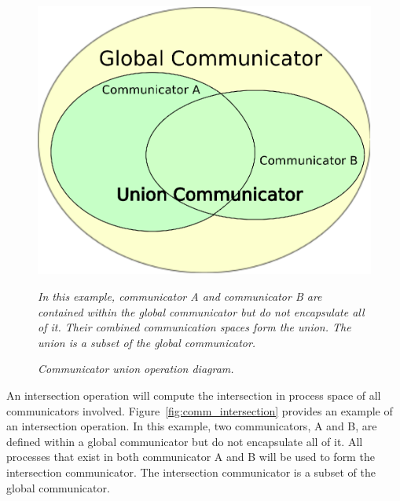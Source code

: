 \documentclass[letterpaper,12pt]{article}
\begin{document}
\begin{figure}[htpb!]
  \centering
  \includegraphics[width=5in]{union_comm.eps}
  \caption{\sl Communicator union operation diagram.}{\sl In this
    example, communicator A and communicator B are contained within
    the global communicator but do not encapsulate all of it. Their
    combined communication spaces form the union. The union is a
    subset of the global communicator.}
  \label{fig:comm_union}
\end{figure}

An intersection operation will compute the intersection in process
space of all communicators
involved. Figure~\ref{fig:comm_intersection} provides an example of an
intersection operation. In this example, two communicators, A and B,
are defined within a global communicator but do not encapsulate all of
it. All processes that exist in both communicator A and B will be used
to form the intersection communicator. The intersection communicator
is a subset of the global communicator.
\end{document}
